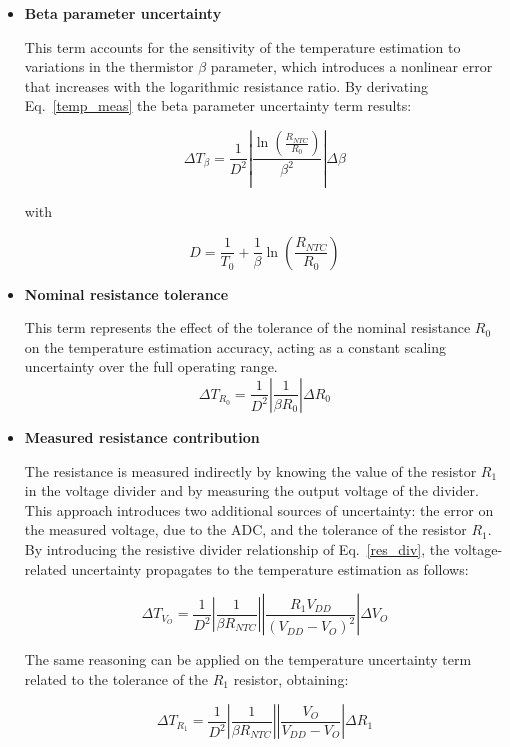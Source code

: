 \begin{itemize}

    \item \textbf{Beta parameter uncertainty}

        This term accounts for the sensitivity of the temperature estimation to variations in the thermistor $\beta$ parameter, which introduces a nonlinear error that increases with the logarithmic resistance ratio. By derivating Eq.~\ref{temp_meas} the beta parameter uncertainty term results:

        \begin{equation}
        \Delta T_{\beta} =
        \frac{1}{D^2}
        \left|\frac{\ln\left(\frac{R_{NTC}}{R_0}\right)}{\beta^2}\right|
        \Delta \beta
        \end{equation}

        with

        \begin{equation}
        D = \frac{1}{T_0} + \frac{1}{\beta}\ln\left(\frac{R_{NTC}}{R_0}\right)
        \end{equation}

    
    \item \textbf{Nominal resistance tolerance}
    
    This term represents the effect of the tolerance of the nominal resistance $R_0$ on the temperature estimation accuracy, acting as a constant scaling uncertainty over the full operating range.
        \begin{equation}
        \Delta T_{R_0} =
        \frac{1}{D^2}
        \left|\frac{1}{\beta R_0}\right|
        \Delta R_0
        \end{equation}

\item \textbf{Measured resistance contribution}

The resistance is measured indirectly by knowing the value of the resistor $R_1$ in the voltage divider and by measuring the output voltage of the divider. This approach introduces two additional sources of uncertainty: the error on the measured voltage, due to the ADC, and the tolerance of the resistor $R_1$. By introducing the resistive divider relationship of Eq.~\ref{res_div}, the voltage-related uncertainty propagates to the temperature estimation as follows:

\begin{equation}
\Delta T_{V_O} =
\frac{1}{D^2}
\left|\frac{1}{\beta R_{NTC}}\right|
\left|\frac{R_1 V_{DD}}{(V_{DD} - V_O)^2}\right|
\Delta V_O
\end{equation}

The same reasoning can be applied on the temperature uncertainty term related to the tolerance of the $R_1$ resistor, obtaining:

\begin{equation}
\Delta T_{R_1} =
\frac{1}{D^2}
\left|\frac{1}{\beta R_{NTC}}\right|
\left|\frac{V_O}{V_{DD} - V_O}\right|
\Delta R_1
\end{equation}

\end{itemize}


